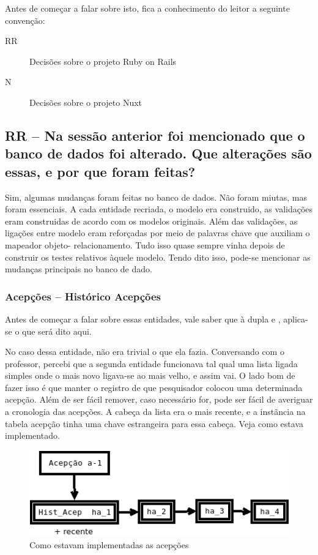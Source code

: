 Antes de começar a falar sobre isto, fica a conhecimento do leitor a seguinte convenção:
\begin{description}
    \item[RR] Decisões sobre o projeto Ruby on Rails
    \item[N] Decisões sobre o projeto Nuxt
\end{description}

\subsection{RR -- Na sessão anterior foi mencionado que o banco de dados foi alterado. Que alterações são essas, e por que
foram feitas?} \label{subsec:db-changes}

Sim, algumas mudanças foram feitas no banco de dados. Não foram miutas, mas foram essenciais. A cada entidade
recriada, o modelo era construido, as validações eram construidas de acordo com os modelos originais. Além das
validações, as ligações entre modelo eram reforçadas por meio de palavras chave que auxiliam o mapeador objeto-
relacionamento. Tudo isso quase sempre vinha depois de construir os testes relativos àquele modelo. Tendo dito
isso, pode-se mencionar as mudanças principais no banco de dado.

\subsubsection{Acepções -- Histórico Acepções}

Antes de começar a falar sobre essas entidades, vale saber que à dupla  e ,
aplica-se o que será dito aqui.

No caso dessa entidade, não era trivial o que ela fazia. Conversando com o professor, percebi que a segunda
entidade funcionava tal qual uma lista ligada simples onde o mais novo ligava-se ao mais velho, e assim vai.
O lado bom de fazer isso é que manter o registro de que pesquisador colocou uma determinada acepção. Além de
ser fácil remover, caso necessário for, pode ser fácil de averiguar a cronologia das acepções. A cabeça da lista
era o mais recente, e a instãncia na tabela acepção tinha uma chave estrangeira para essa cabeça. Veja como
estava implementado.

\begin{figure}[htb]
    \centering
    \includegraphics[width=.6\textwidth]{figuras/acep.png}
    \caption{Como estavam implementadas as acepções}
    \label{fig:acep}
\end{figure}

